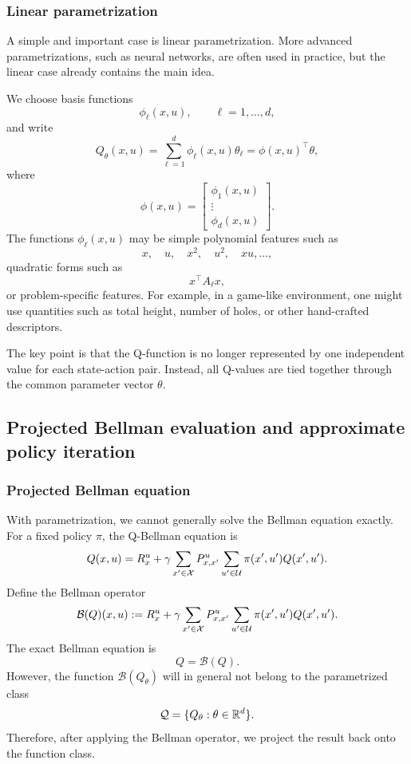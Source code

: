 \subsubsection{Linear parametrization}

A simple and important case is linear parametrization. More advanced parametrizations, such as
neural networks, are often used in practice, but the linear case already contains the main idea.

We choose basis functions
\[
\phi_\ell(x,u),
\qquad
\ell=1,\dots,d,
\]
and write
\[
Q_\theta(x,u)
=
\sum_{\ell=1}^{d}\phi_\ell(x,u)\theta_\ell
=
\phi(x,u)^\top\theta,
\]
where
\[
\phi(x,u)
=
\begin{bmatrix}
\phi_1(x,u)\\
\vdots\\
\phi_d(x,u)
\end{bmatrix}.
\]
The functions \(\phi_\ell(x,u)\) may be simple polynomial features such as
\[
x,\quad u,\quad x^2,\quad u^2,\quad xu,\dots,
\]
quadratic forms such as
\[
x^\top A_\ell x,
\]
or problem-specific features. For example, in a game-like environment, one might use quantities
such as total height, number of holes, or other hand-crafted descriptors.

The key point is that the Q-function is no longer represented by one independent value for each
state-action pair. Instead, all Q-values are tied together through the common parameter vector
\(\theta\).

\subsection{Projected Bellman evaluation and approximate policy iteration}

\subsubsection{Projected Bellman equation}

With parametrization, we cannot generally solve the Bellman equation exactly. For a fixed policy
\(\pi\), the Q-Bellman equation is
\[
Q(x,u)
=
R_x^u
+
\gamma\sum_{x'\in\mathcal{X}}P^u_{x,x'}
\sum_{u'\in\mathcal{U}}\pi(x',u')Q(x',u').
\]
Define the Bellman operator
\[
\mathcal{B}(Q)(x,u)
:=
R_x^u
+
\gamma\sum_{x'\in\mathcal{X}}P^u_{x,x'}
\sum_{u'\in\mathcal{U}}\pi(x',u')Q(x',u').
\]
The exact Bellman equation is
\[
Q=\mathcal{B}(Q).
\]
However, the function \(\mathcal{B}(Q_\theta)\) will in general not belong to the parametrized
class
\[
\mathcal{Q}
=
\{Q_\theta:\theta\in\mathbb{R}^d\}.
\]
Therefore, after applying the Bellman operator, we project the result back onto the function
class.

